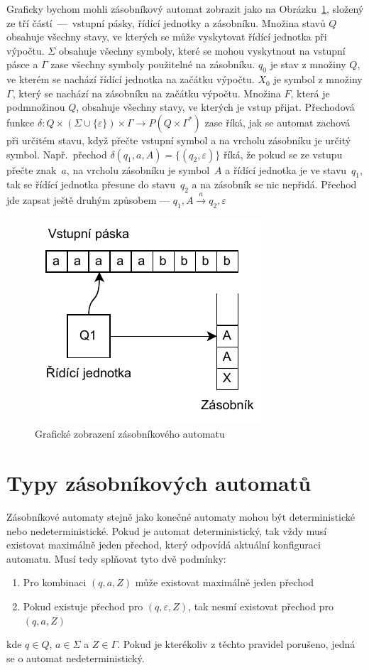 Graficky bychom mohli zásobníkový automat zobrazit jako na Obrázku~\ref{fig:PDAComponents}, složený ze tří částí~---~vstupní pásky, řídící jednotky a zásobníku. Množina stavů $Q$ obsahuje všechny stavy, ve kterých se může vyskytovat řídící jednotka při výpočtu. $\Sigma$ obsahuje všechny symboly, které se mohou vyskytnout na vstupní pásce a $\Gamma$ zase všechny symboly použitelné na zásobníku. $q_0$ je stav z množiny $Q$, ve kterém se nachází řídící jednotka na začátku výpočtu. $X_0$ je symbol z množiny $\Gamma$, který se nachází na zásobníku na začátku výpočtu. Množina $F$, která je podmnožinou $Q$, obsahuje všechny stavy, ve kterých je vstup přijat. Přechodová funkce $\delta : Q \times (\Sigma \cup \{\varepsilon\}) \times \Gamma \rightarrow P(Q \times \Gamma^*)$ zase říká, jak se automat zachová při určitém stavu, když přečte vstupní symbol a na vrcholu zásobníku je určitý symbol. Např.\ přechod $\delta(q_1,a,A) = \{(q_2,\varepsilon)\}$ říká, že pokud se ze vstupu přečte znak~$a$, na vrcholu zásobníku je symbol~$A$ a řídící jednotka je ve stavu~$q_1$, tak se řídící jednotka přesune do stavu~$q_2$ a na zásobník se nic nepřidá. Přechod jde zapsat ještě druhým způsobem --- $q_1,A \xrightarrow{a} q_2,\varepsilon$

\begin{figure}[h]
    \centering
    \includegraphics{Figures/PDAComponents.drawio.pdf}
    \caption{Grafické zobrazení zásobníkového automatu}\label{fig:PDAComponents}
\end{figure}

\section{Typy zásobníkových automatů}\label{sec:TypesOfPDA}


Zásobníkové automaty stejně jako konečné automaty mohou být deterministické nebo nedeterministické. Pokud je automat deterministický, tak vždy musí existovat maximálně jeden přechod, který odpovídá aktuální konfiguraci automatu. Musí tedy splňovat tyto dvě podmínky:
\begin{enumerate}
    \item Pro kombinaci $(q,a,Z)$ může existovat maximálně jeden přechod
    \item Pokud existuje přechod pro $(q,\varepsilon,Z)$, tak nesmí existovat přechod pro $(q,a,Z)$
\end{enumerate}
kde $q \in Q$, $a \in \Sigma$ a $Z \in \Gamma$. Pokud je kterékoliv z těchto pravidel porušeno, jedná se o automat nedeterministický.~\cite{Dale2024}

